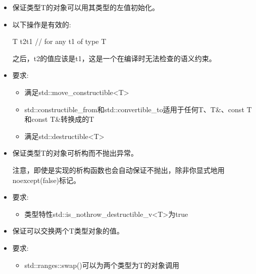 \begin{itemize}
\item
保证类型T的对象可以用其类型的左值初始化。

\item
以下操作是有效的:

\begin{cpp}
T t2{t1} // for any t1 of type T
\end{cpp}

之后，t2的值应该是t1，这是一个在编译时无法检查的语义约束。

\item
要求:
\begin{itemize}
\item
满足std::move\_constructible<T>

\item
std::constructible\_from和std::convertible\_to适用于任何T、T\&、const T和const T\&转换成的T

\item
满足std::destructible<T>
\end{itemize}
\end{itemize}


\begin{itemize}
\item
保证类型T的对象可析构而不抛出异常。

注意，即使是实现的析构函数也会自动保证不抛出，除非你显式地用noexcept(false)标记。

\item
要求:
\begin{itemize}
\item
类型特性std::is\_nothrow\_destructible\_v<T>为true
\end{itemize}
\end{itemize}


\begin{itemize}
\item
保证可以交换两个T类型对象的值。

\item
要求:
\begin{itemize}
\item
std::ranges::swap()可以为两个类型为T的对象调用
\end{itemize}
\end{itemize}


